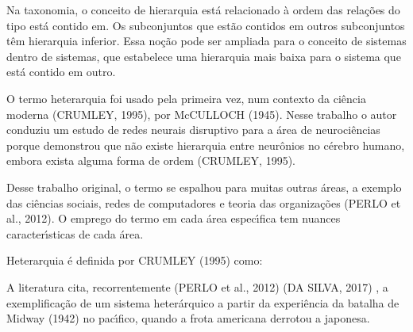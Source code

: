 \documentclass[
12pt,		%
openright,	%
twoside,  %
a4paper,			%
chapter=TITLE,		%
english,			%
french,				%
spanish,			%
brazil				%
]{USPSC-classe/USPSC}
\begin{document}
Na taxonomia, o conceito de hierarquia est\'a relacionado \`a ordem das rela\c{c}\~oes do tipo \textquotedbl est\'a contido em\textquotedbl . Os subconjuntos que est\~ao contidos em outros subconjuntos t\^em hierarquia inferior. Essa no\c{c}\~ao pode ser ampliada para o conceito de \textquotedbl sistemas dentro de sistemas\textquotedbl , que estabelece uma hierarquia mais baixa para o sistema que est\'a contido em outro.









O termo heterarquia foi usado pela primeira vez, num contexto da ci\^encia moderna  (CRUMLEY, 1995), por  McCULLOCH (1945).  Nesse trabalho o autor conduziu um estudo de redes neurais disruptivo para a \'area de neuroci\^encias porque demonstrou que n\~ao existe hierarquia entre neur\^onios no c\'erebro humano, embora exista alguma forma de ordem  (CRUMLEY, 1995).









Desse trabalho original, o termo se espalhou para muitas outras \'areas, a exemplo das ci\^encias sociais, redes de computadores e teoria das organiza\c{c}\~oes  (PERLO et al., 2012). O emprego do termo em cada \'area espec\'{\i}fica tem nuances caracter\'{\i}sticas de cada \'area.









Heterarquia \'e definida por  CRUMLEY (1995) como:










\noindent\begin{center}\mbox{\centering{}}\end{center}


A literatura cita, recorrentemente  (PERLO et al., 2012) (DA SILVA, 2017) , a exemplifica\c{c}\~ao de um sistema heter\'arquico a partir da experi\^encia da batalha de Midway (1942) no pac\'{\i}fico, quando a frota americana derrotou a japonesa.
\end{document}
